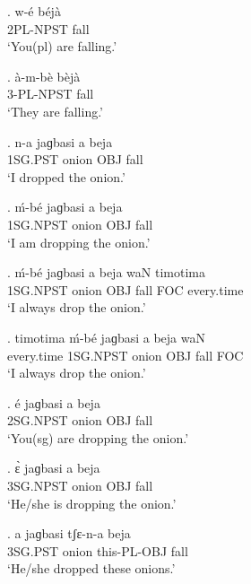 \documentclass{assets/fieldnotes}
\begin{document}
{

\exg.
w-é        béjà \\
2PL-NPST   fall \\%
`You(pl) are falling.'

\exg.
à-m-bè      bèjà \\
3-PL-NPST   fall \\%
`They are falling.'

\exg.
n-a    jaɡbasi   a     beja \\
1SG.PST   onion     OBJ   fall \\%
`I dropped the onion.'

\exg.
ḿ-bé      jaɡbasi   a     beja \\
1SG.NPST   onion     OBJ   fall \\%
`I am dropping the onion.'

\exg.
ḿ-bé      jaɡbasi   a     beja   waN   timotima   \\
1SG.NPST   onion     OBJ   fall   FOC   every.time \\%
`I always drop the onion.' \label{I always drop the onion}

\exg.
timotima     ḿ-bé       jaɡbasi   a     beja   waN \\
every.time   1SG.NPST   onion     OBJ   fall   FOC \\%
`I always drop the onion.'




\exg.
é         jaɡbasi   a     beja \\
2SG.NPST   onion     OBJ   fall \\%
`You(sg) are dropping the onion.'

\exg.
ɛ̀         jaɡbasi   a     beja \\
3SG.NPST   onion     OBJ   fall \\%
`He/she is dropping the onion.'

\exg.
a     jaɡbasi   tʃɛ-n-a       beja \\
3SG.PST   onion     this-PL-OBJ   fall \\%
`He/she dropped these onions.'

}
\end{document}
